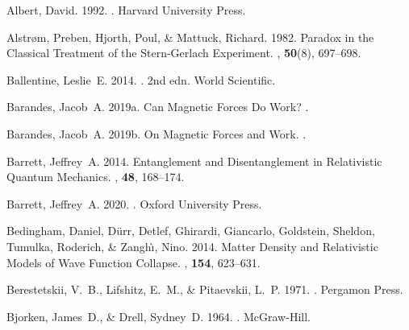 \documentclass[onecolumn,secnumarabic,amsmath,amssymb,balancelastpage,nofootinbib]{article}
\begin{document}
\begin{thebibliography}{}

Albert, David. 1992.
.
\newblock Harvard University Press.

Alstr{\o}m, Preben, Hjorth, Poul, \& Mattuck, Richard. 1982.
\newblock Paradox in the Classical Treatment of the Stern-Gerlach Experiment.
, {\bf 50}(8), 697--698.

Ballentine, Leslie~E. 2014.
. 2nd edn.
\newblock World Scientific.

Barandes, Jacob~A. 2019a.
\newblock Can Magnetic Forces Do Work?
.

Barandes, Jacob~A. 2019b.
\newblock On Magnetic Forces and Work.
.

Barrett, Jeffrey~A. 2014.
\newblock Entanglement and Disentanglement in Relativistic Quantum Mechanics.
, {\bf 48},
  168--174.

Barrett, Jeffrey~A. 2020.
.
\newblock Oxford University Press.

Bedingham, Daniel, D\"urr, Detlef, Ghirardi, Giancarlo, Goldstein, Sheldon,
  Tumulka, Roderich, \& Zangh\`{\i}, Nino. 2014.
\newblock Matter Density and Relativistic Models of Wave Function Collapse.
, {\bf 154}, 623--631.

Berestetskii, V.~B., Lifshitz, E.~M., \& Pitaevskii, L.~P. 1971.
.
\newblock Pergamon Press.

Bjorken, James~D., \& Drell, Sydney~D. 1964.
.
\newblock McGraw-Hill.


\end{thebibliography}
\end{document}
